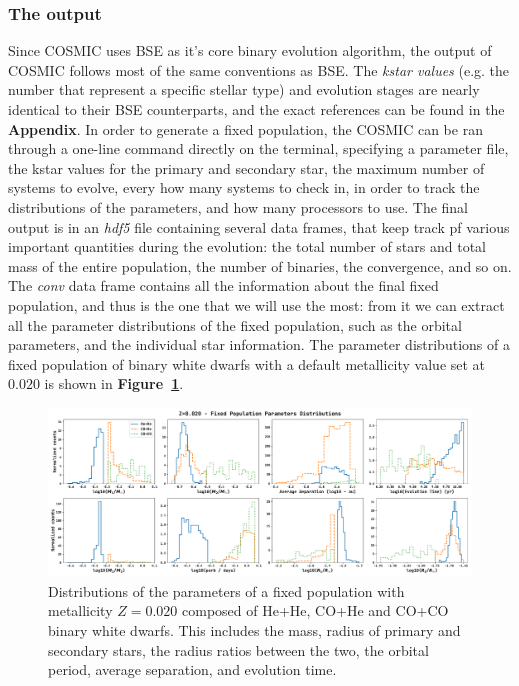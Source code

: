 \subsubsection{The output}
Since COSMIC uses BSE as it’s core binary evolution algorithm, the output of COSMIC follows most of the same conventions as BSE. 
The \textit{kstar values} (e.g. the number that represent a specific stellar type) and evolution stages are nearly identical to their BSE counterparts, and the exact references can be found in the \textbf{Appendix}.
In order to generate a fixed population, the COSMIC can be ran through a one-line command directly on the terminal, specifying a parameter file, the kstar values for the primary and secondary star, the maximum number of systems to evolve, every how many systems to check in, in order to track the distributions of the parameters, and how many processors to use.
The final output is in an \textit{hdf5} file containing several data frames, that keep track pf various important quantities during the evolution: the total number of stars and total mass of the entire population, the number of binaries, the convergence, and so on. 
The \textit{conv} data frame contains all the information about the final fixed population, and thus is the one that we will use the most: from it we can extract all the parameter distributions of the fixed population, such as the orbital parameters, and the individual star information.
The parameter distributions of a fixed population of binary white dwarfs with a default metallicity value set at $0.020$ is shown in \textbf{Figure~\ref{fig: first fixed pop distributions}}.
\begin{figure}[ht!]
    \begin{center}
        \includegraphics[width=\textwidth]{images/first_fixed_params_distr.pdf}
    \end{center}
    \caption{Distributions of the parameters of a fixed population with metallicity $Z=0.020$ composed of He+He, CO+He and CO+CO binary white dwarfs. This includes the mass, radius of primary and secondary stars, the radius ratios between the two, the orbital period, average separation, and evolution time.}\label{fig: first fixed pop distributions}
\end{figure}



